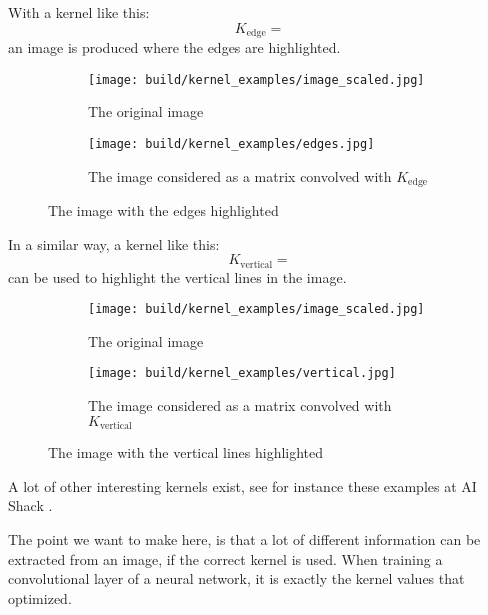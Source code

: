 With a kernel like this:
\begin{equation}
    K_{\text{edge}} = 
\end{equation}
an image is produced where the edges are highlighted.

\begin{figure}[ht]
    \centering
    \begin{subfigure}{0.45\textwidth}
        \texttt{[image: build/kernel\_examples/image\_scaled.jpg]}
        \caption{The original image}
    \end{subfigure}
    \begin{subfigure}{0.45\textwidth}
        \texttt{[image: build/kernel\_examples/edges.jpg]}
        \caption{The image considered as a matrix convolved with $K_{\text{edge}}$}
    \end{subfigure}
    \caption{The image with the edges highlighted}
\end{figure}

In a similar way, a kernel like this:
\begin{equation}
    K_{\text{vertical}} = 
\end{equation}
can be used to highlight the vertical lines in the image.

\begin{figure}[ht]
    \centering
    \begin{subfigure}{0.45\textwidth}
        \texttt{[image: build/kernel\_examples/image\_scaled.jpg]}
        \caption{The original image}
    \end{subfigure}
    \begin{subfigure}{0.45\textwidth}
        \texttt{[image: build/kernel\_examples/vertical.jpg]}
        \caption{The image considered as a matrix convolved with $K_{\text{vertical}}$}
    \end{subfigure}
    \caption{The image with the vertical lines highlighted}
\end{figure}

A lot of other interesting kernels exist, see for instance these examples at AI Shack \cite{kernel-example-webpage}.

The point we want to make here, is that a lot of different information can be extracted from an image,
if the correct kernel is used.
When training a convolutional layer of a neural network, it is exactly the kernel values that optimized.

